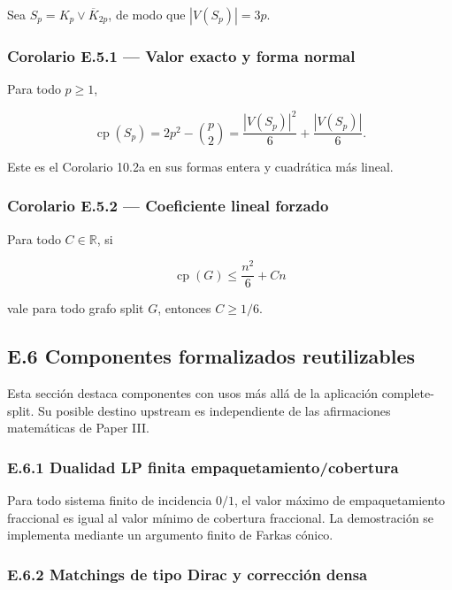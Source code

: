 \documentclass[spanish,11pt,a4paper]{article}
\begin{document}
Sea \(S_p=K_p\vee\overline K_{2p}\), de modo que \(|V(S_p)|=3p\).

\subsubsection{Corolario E.5.1 --- Valor exacto y forma
normal}\label{corolario-e.5.1-valor-exacto-y-forma-normal}

Para todo \(p\ge1\),

\[\operatorname{cp}(S_p)=2p^2-\binom p2=\frac{|V(S_p)|^2}{6}+\frac{|V(S_p)|}{6}.\]

Este es el Corolario 10.2a en sus formas entera y cuadrática más lineal.

\subsubsection{Corolario E.5.2 --- Coeficiente lineal
forzado}\label{corolario-e.5.2-coeficiente-lineal-forzado}

Para todo \(C\in\mathbb R\), si

\[\operatorname{cp}(G)\le \frac{n^2}{6}+Cn\]

vale para todo grafo split \(G\), entonces \(C\ge1/6\).

\subsection{E.6 Componentes formalizados
reutilizables}\label{e.6-componentes-formalizados-reutilizables}

Esta sección destaca componentes con usos más allá de la aplicación
complete-split. Su posible destino upstream es independiente de las
afirmaciones matemáticas de Paper III.

\subsubsection{E.6.1 Dualidad LP finita
empaquetamiento/cobertura}\label{e.6.1-dualidad-lp-finita-empaquetamientocobertura}

Para todo sistema finito de incidencia \(0/1\), el valor máximo de
empaquetamiento fraccional es igual al valor mínimo de cobertura
fraccional. La demostración se implementa mediante un argumento finito
de Farkas cónico.

\subsubsection{E.6.2 Matchings de tipo Dirac y corrección
densa}\label{e.6.2-matchings-de-tipo-dirac-y-correcciuxf3n-densa}
\end{document}
